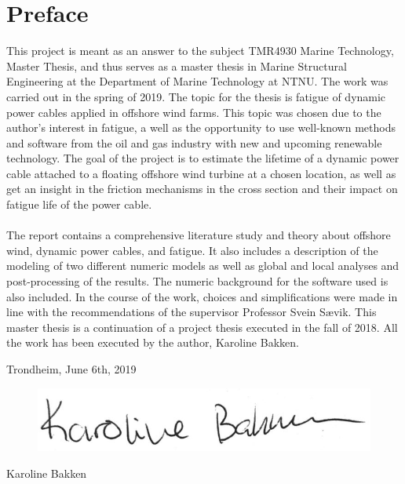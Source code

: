 \hypersetup{pageanchor=true}
%
\chapter*{Preface}
This project is meant as an answer to the subject TMR4930 Marine Technology, Master Thesis, and thus serves as a master thesis in Marine Structural Engineering at the Department of Marine Technology at NTNU. The work was carried out in the spring of 2019. \newline
\newline
The topic for the thesis is fatigue of dynamic power cables applied in offshore wind farms. This topic was chosen due to the author's interest in fatigue, a well as the opportunity to use well-known methods and software from the oil and gas industry with new and upcoming renewable technology. The goal of the project is to estimate the lifetime of a dynamic power cable attached to a floating offshore wind turbine at a chosen location, as well as get an insight in the friction mechanisms in the cross section and their impact on fatigue life of the power cable. \\\\ The report contains a comprehensive literature study and theory about offshore wind, dynamic power cables, and fatigue. It also includes a description of the modeling of two different numeric models as well as global and local analyses and post-processing of the results. The numeric background for the software used is also included. In the course of the work, choices and simplifications were made in line with the recommendations of the supervisor Professor Svein Sævik. \newline
\newline
This master thesis is a continuation of a project thesis executed in the fall of 2018. All the work has been executed by the author, Karoline Bakken. 
\newline
\newline
\newline
\newline
\newline
\newline
\begin{center}
    Trondheim, June 6th, 2019
    \end{center}
\begin{figure}[H]
\centering
\includegraphics[scale=0.5]{figures/sign}
\end{figure}
\begin{center}
Karoline Bakken
\end{center}
